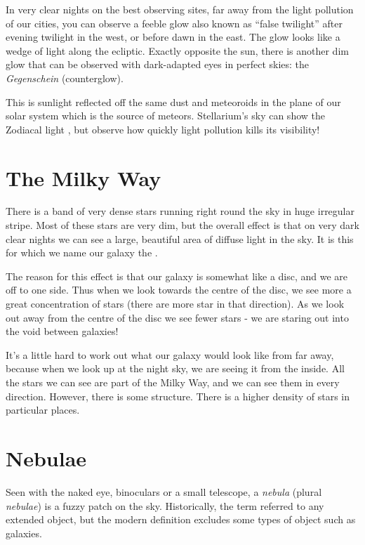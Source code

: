 In very clear nights on the best observing sites, far away from the
light pollution of our cities, you can observe a feeble glow also
known as ``false twilight'' after evening twilight in the west, or
before dawn in the east. The glow looks like a wedge of light along
the ecliptic. Exactly opposite the sun, there is another dim glow that
can be observed with dark-adapted eyes in perfect skies: the
\emph{Gegenschein} (counterglow). 

This is sunlight reflected off the same dust and meteoroids in the
plane of our solar system which is the source of meteors. Stellarium's
sky can show the Zodiacal light \citep{Kwon:2004:ZodiacalLight}, but
observe how quickly light pollution kills its visibility!


\section{The Milky Way}
\label{sec:Phenomena:MilkyWay}

There is a band of very dense stars running right round the sky in huge
irregular stripe. Most of these stars are very dim, but the overall
effect is that on very dark clear nights we can see a large, beautiful
area of diffuse light in the sky. It is this for which we name our
galaxy the .

The reason for this effect is that our galaxy is somewhat like a disc,
and we are off to one side. Thus when we look towards the centre of the
disc, we see more a great concentration of stars (there are more star in
that direction). As we look out away from the centre of the disc we see
fewer stars - we are staring out into the void between galaxies!

It's a little hard to work out what our galaxy would look like from far
away, because when we look up at the night sky, we are seeing it from
the inside. All the stars we can see are part of the Milky Way, and we
can see them in every direction. However, there is some structure. There
is a higher density of stars in particular places.

\section{Nebulae}
\label{sec:Phenomena:Nebulae}

Seen with the naked eye, binoculars or a small telescope, a
\emph{nebula} (plural \emph{nebulae}) is a fuzzy patch on the sky.
Historically, the term referred to any extended object, but the modern
definition excludes some types of object such as galaxies.

